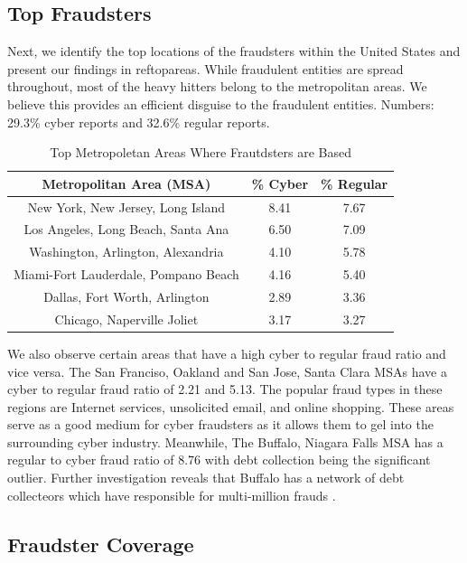 \documentclass[conference]{IEEEtran}
\begin{document}
\subsection{Top Fraudsters}\label{fraudsters}
Next, we identify the top locations of the fraudsters within the United States and present our findings in ref{topareas}. While fraudulent entities are spread throughout, most of the heavy hitters belong to the metropolitan areas. We believe this provides an efficient disguise to the fraudulent entities.  
Numbers: 29.3\% cyber reports and 32.6\% regular reports.


\begin{table}[h]
\centering
\begin{tabular}{c|c|c}
\hline
\bfseries Metropolitan Area (MSA) & \bfseries \% Cyber & \bfseries \% Regular\\
\hline
\hline
New York, New Jersey, Long Island & 8.41 & 7.67 \\
\hline
Los Angeles, Long Beach, Santa Ana & 6.50 & 7.09 \\
\hline
Washington, Arlington, Alexandria & 4.10 & 5.78 \\
\hline
Miami-Fort Lauderdale, Pompano Beach & 4.16 & 5.40 \\
\hline
Dallas, Fort Worth, Arlington & 2.89 & 3.36\\
\hline
Chicago, Naperville Joliet & 3.17 & 3.27 \\
\hline
\end{tabular}
\vspace{8pt}
\caption{Top Metropoletan Areas Where Frautdsters are Based}\label{topareas}
\vspace{-15pt}
\end{table}

We also observe certain areas that have a high cyber to regular fraud ratio and vice versa. The San Franciso, Oakland and San Jose, Santa Clara MSAs have a cyber to regular fraud ratio of 2.21 and 5.13. The popular fraud types in these regions are Internet services, unsolicited email, and online shopping. These areas serve as a good medium for cyber fraudsters as it allows them to gel into the surrounding cyber industry. Meanwhile, The Buffalo, Niagara Falls MSA has a regular to cyber fraud ratio of 8.76 with debt collection being the significant outlier. Further investigation reveals that Buffalo has a network of debt collecteors which have responsible for multi-million frauds \cite{buffalo1, buffalo2}.


\subsection{Fraudster Coverage}\label{fraudsters}
\end{document}
